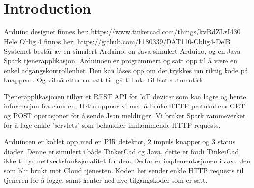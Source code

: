 \section{Introduction}
\label{sec:introduction}
Arduino designet finnes her:  https://www.tinkercad.com/things/kvRdZLvI430 \\
Hele Oblig 4 finnes her: https://github.com/h180339/DAT110-Oblig4-DelB\\

Systemet består av en simulert Arduino, en Java simulert Arduino, og en Java Spark tjenerapplikasjon. Arduinoen er programmert og satt opp til å være en enkel adgangskontrollenhet. Den kan låses opp om det trykkes inn riktig kode på knappene. Og vil så etter en satt tid gå tilbake til låst automatisk. 

Tjenerapplikasjonen tilbyr et REST API for IoT devicer som kan lagre og hente informasjon fra clouden. Dette oppnår vi med å bruke HTTP protokollens GET og POST operasjoner for å sende Json meldinger. Vi bruker Spark rammeverket for å lage enkle "servlets" som behandler innkommende HTTP requests. 

Arduinoen er koblet opp med en PIR detektor, 2 impuls knapper og 3 status dioder. Denne er simulert i både TinkerCad og Java, dette er fordi TinkerCad ikke tilbyr nettverksfunksjonalitet for den. Derfor er implementasjonen i Java den som blir brukt mot Cloud tjenesten. Koden her sender enkle HTTP requests til tjeneren for å logge, samt henter ned nye tilgangskoder som er satt.

\pagebreak